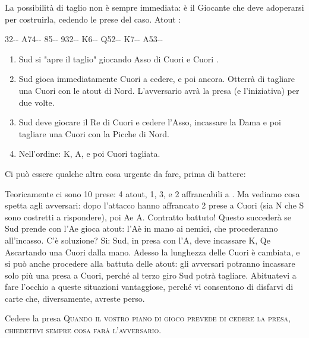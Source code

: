 \documentclass[../corsofiori.tex]{subfiles}
\begin{document}
\newpage

  La possibilità di taglio non è sempre immediata: è il Giocante che deve adoperarsi per costruirla, cedendo le prese
  del caso. Atout \Sp:

\newgame
{} {32}{-}{-}
 {A74}{-}{-}
\hfill
{}
\showAll
\hfill
\newgame
{} {85}{-}{-}
 {932}{-}{-}
\hfill
{}
\showAll
\hfill
\newgame
{} {K6}{-}{-}
 {Q52}{-}{-}
\hfill
{}
\showAll
\hfill
\newgame
{} {K7}{-}{-}
 {A53}{-}{-}
\hfill
{}
\showAll
\hfill

\begin{enumerate}[label=\protect\numcircledtikz{\small\arabic*}]
\item Sud si "apre il taglio" giocando Asso di Cuori e Cuori .
 \item  Sud gioca immediatamente Cuori a cedere, e poi ancora. Otterrà di tagliare una Cuori con le atout di Nord.
     L'avversario avrà la presa (e l'iniziativa) per due volte.
 \item  Sud deve giocare il Re di Cuori e cedere l’Asso, incassare la Dama e poi tagliare una Cuori con la Picche di
     Nord.
 \item Nell'ordine: K, A\He, e poi Cuori tagliata.
\end{enumerate}

Ci può essere qualche altra cosa urgente da fare, prima di battere:
\newgame
{}
\leftupper{\boardtext*}%
{\dealertext\quad}{\vulnertext}

\showAll*

Teoricamente ci sono 10 prese: 4 atout, 1\He, 3\Di, e 2 affrancabili a \Cl.  Ma vediamo cosa spetta agli avversari: dopo
l’attacco hanno affrancato 2 prese a Cuori (sia N che S sono costretti a rispondere), poi A\Cl e A\Sp. Contratto
battuto!  Questo succederà se Sud prende con l’A\He e gioca atout: l’A\Sp è in mano ai nemici, che procederanno
all’incasso. C’è soluzione?  Si: Sud, in presa con l’A\He, deve incassare K\Di, Q\Di e A\Di scartando una Cuori dalla
mano. Adesso la lunghezza delle Cuori è cambiata, e si può anche procedere alla battuta delle atout: gli avversari
potranno incassare solo più una presa a Cuori, perché al terzo giro Sud potrà tagliare.  Abituatevi a fare l’occhio
a queste situazioni vantaggiose, perché vi consentono di disfarvi di carte che, diversamente, avreste perso.

\begin{regola}{Cedere la presa}
\textsc{Quando il vostro piano di gioco prevede di cedere la presa, chiedetevi sempre cosa farà l’avversario.}
\end{regola}
\end{document}

